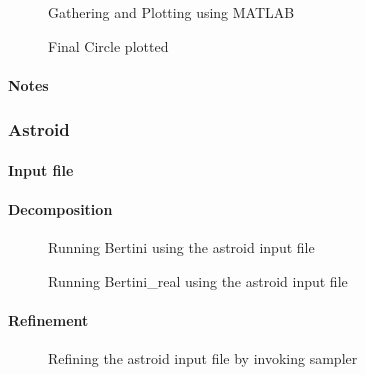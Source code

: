 	\begin{figure}[H]\centering
	     \caption{Gathering and Plotting using MATLAB}
	\end{figure}

	\begin{figure}[H]\centering
	     \caption{Final Circle plotted}
	\end{figure}

\paragraph{Notes}


\subsubsection{Astroid}

\paragraph{Input file}


\paragraph{Decomposition}
	
	\begin{figure}[H]\centering
	    \caption{Running Bertini using the astroid input file}
	\end{figure}

	\begin{figure}[H]\centering
	    \caption{Running Bertini\_real using the astroid input file}
	\end{figure}
		
\paragraph{Refinement}

	\begin{figure}[H]\centering
	    \caption{Refining the astroid input file by invoking sampler}
	\end{figure}

